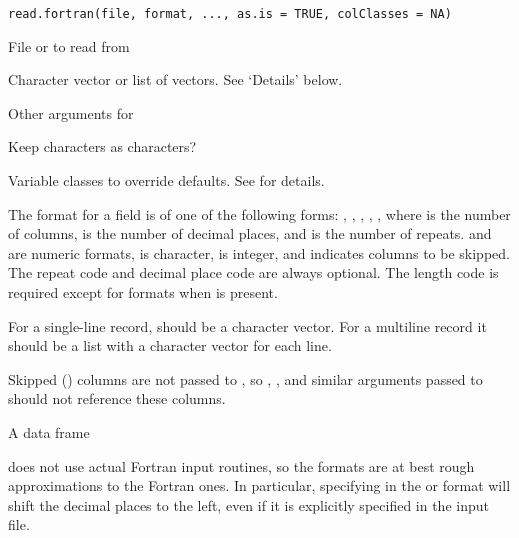 %
\begin{Usage}
\begin{verbatim}
read.fortran(file, format, ..., as.is = TRUE, colClasses = NA)
\end{verbatim}
\end{Usage}
%
\begin{Arguments}
\begin{ldescription}
\item[\code{file}] File or  to read from
\item[\code{format}] Character vector or list of vectors.  See
`Details' below.
\item[\code{...}] Other arguments for 
\item[\code{as.is}] Keep characters as characters?
\item[\code{colClasses}] Variable classes to override defaults. See
 for details.
\end{ldescription}
\end{Arguments}
%
\begin{Details}\relax
The format for a field is of one of the following forms: ,
, , , , where  is
the number of columns,  is the number of decimal places, and
 is the number of repeats.  and  are numeric
formats,  is character,  is integer, and 
indicates columns to be skipped. The repeat code  and decimal
place code  are always optional. The length code  is
required except for  formats when  is present.

For a single-line record,  should be a character
vector. For a multiline record it should be a list with a character
vector for each line.

Skipped () columns are not passed to , so
, , and similar arguments passed to
 should not reference these columns.
\end{Details}
%
\begin{Value}
A data frame
\end{Value}
%
\begin{Note}\relax
{} does not use actual Fortran input routines, so
the formats are at best rough approximations to the Fortran ones.
In particular, specifying  in the  or 
format will shift the decimal  places to the left, even if
it is explicitly specified in the input file.
\end{Note}
